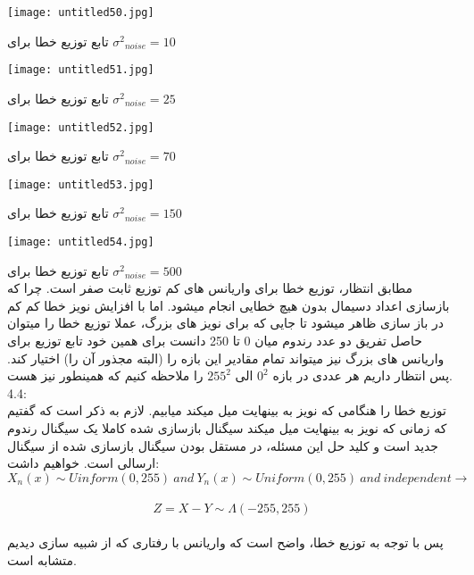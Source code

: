 \begin{center}
    \texttt{[image: untitled50.jpg]}
\end{center}

\centering
تابع توزیع خطا برای ${\sigma^2}_{noise} = 10$
\\[1cm]


\begin{center}
    \texttt{[image: untitled51.jpg]}
\end{center}

\centering
تابع توزیع خطا برای ${\sigma^2}_{noise} = 25$
\\[1cm]


\begin{center}
    \texttt{[image: untitled52.jpg]}
\end{center}

\centering
تابع توزیع خطا برای ${\sigma^2}_{noise} = 70$
\\[1cm]


\begin{center}
    \texttt{[image: untitled53.jpg]}
\end{center}

\centering
تابع توزیع خطا برای ${\sigma^2}_{noise} = 150$
\\[1cm]


\begin{center}
    \texttt{[image: untitled54.jpg]}
\end{center}

\centering
تابع توزیع خطا برای ${\sigma^2}_{noise} = 500$
\\[1cm]

\justify
مطابق انتظار، توزیع خطا برای واریانس های کم توزیع ثابت صفر است. چرا که بازسازی اعداد دسیمال بدون هیچ خطایی انجام میشود. اما با افزایش نویز خطا کم کم در باز سازی ظاهر میشود تا جایی که برای نویز های بزرگ، عملا توزیع خطا را میتوان حاصل تفریق دو عدد رندوم میان 0 تا 250 دانست  برای همین خود تابع توزیع برای واریانس های بزرگ نیز میتواند تمام مقادیر این بازه را  (البته مجذور آن را) اختیار کند.
پس انتظار داریم هر عددی در بازه ${0}^2$ الی ${255}^2$ را ملاحظه کنیم که همینطور نیز هست.
\\[0.5cm]
4.4:
\\
توزیع خطا را هنگامی که نویز به بینهایت میل میکند میابیم. لازم به ذکر است که گفتیم که زمانی که نویز به بینهایت میل میکند سیگنال بازسازی شده کاملا یک سیگنال رندوم جدید است و کلید حل این مسئله، در مستقل بودن سیگنال بازسازی شده از سیگنال ارسالی است. خواهیم داشت:
\\
\[
X_n(x) \sim Uinform(0,255)\  {  and  }\ {Y_n}(x) \sim Uniform(0,255)\ {  and  }\ {  independent  } \rightarrow  
\]
\\
\[
Z=X-Y \sim \Lambda(-255,255)
\]
\\
پس با توجه به توزیع خطا، واضح است که واریانس با رفتاری که از شبیه سازی دیدیم متشابه است.






